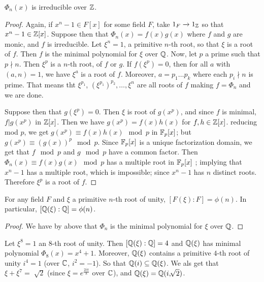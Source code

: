 \begin{theorem}\label{theorem_8.7.4}
  $\Phi_n(x)$ is irreducible over  $\mathbb{Z}$.
\end{theorem}
\begin{proof}
  Again, if $x^n-1 \in F[x]$ for some field $F$, take  $1_F \xrightarrow{}
  1_{\mathbb{Z}}$ so that $x^n-1 \in \mathbb{Z}[x]$. Suppose then that $\Phi_n(x)=f(x)g(x)$
  where $f$ and  $g$ are monic, and  $f$ is irreducible. Let $\xi^n=1$, a
  primitive $n$-th root, so that $\xi$ is a root of $f$. Then $f$ is the
  minimal polynomial for $\xi$ over  $\mathbb{Q}$. Now, let $p$ a prime such that $p
  \nmid n$. Then $\xi^p$ is a $n$-th root, of $f$ or $g$. If  $f(\xi^p)=0$,
  then for all $a$ with  $(a,n)=1$, we have $\xi^a$ is a root of $f$.
  Moreover,  $a=p_1 \dots p_k$ where each $p_i \nmid n$ is prime. That means
  tht  $\xi^{p_1}$, $(\xi^{p_1})^{p_2}, \dots, \xi^n$ are all roots of $f$
  making  $f=\Phi_n$ and we are done.

  Suppose then that $g(\xi^p)=0$. Then $\xi$ is root of  $g(x^p)$,
  and since $f$ is minimal, $f|g(x^p)$ in $\mathbb{Z}[x]$. Then we have
  $g(x^p)=f(x)h(x)$ for $f,h \in \mathbb{Z}[x]$. reducing mod $p$, we get
  $g(x^p) \equiv f(x)h(x) \mod{p}$ in $\mathbb{F}_p[x]$; but $g(x^p) \equiv (g(x))^p
  \mod{p}$. Since $\mathbb{F}_p[x]$ is a unique factorization domain, we get that $f
  \mod{p}$ and $g \mod{p}$ have a common factor. Then $\Phi_n(x) \equiv
  f(x)g(x) \mod{p}$ has a multiple root in $\mathbb{F}_p[x]$ ; implying that $x^n-1$
  has a multiple root, which is impossible; since $x^n-1$ has  $n$ distinct
  roots. Therefore $\xi^p$ is a root of  $f$.
\end{proof}
\begin{corollary}
  For any field $F$ and $\xi$ a primitive $n$-th root of unity,
  $[F(\xi):F]=\phi(n)$. In particular, $[\mathbb{Q}(\xi):\mathbb{Q}]=\phi(n)$.
\end{corollary}
\begin{proof}
  We have by above that $\Phi_n$ is the minimal polynomial for  $\xi$ over
  $\mathbb{Q}$.
\end{proof}

\begin{example}\label{8.19}
  Let $\xi^8=1$ an  $8$-th root of unity. Then  $[\mathbb{Q}(\xi):\mathbb{Q}]=4$ and $\mathbb{Q}(\xi)$
  has minimal polynomial $\Phi_8(x)=x^4+1$. Moreover, $\mathbb{Q}(\xi)$ contains a
  primitive $4$-th root of unity $i^4=1$ (over $\mathbb{C}$,  $i^2=-1$). So that
  $\mathbb{Q}(i) \subseteq \mathbb{Q}(\xi)$. We als get that $\xi+\xi^7=\sqrt[]{2}$ (since
  $\xi=e^{\frac{2i\pi}{8}}$ over $\mathbb{C}$), and $\mathbb{Q}(\xi)=\mathbb{Q}(i,\sqrt[]{2})$.
\end{example}
